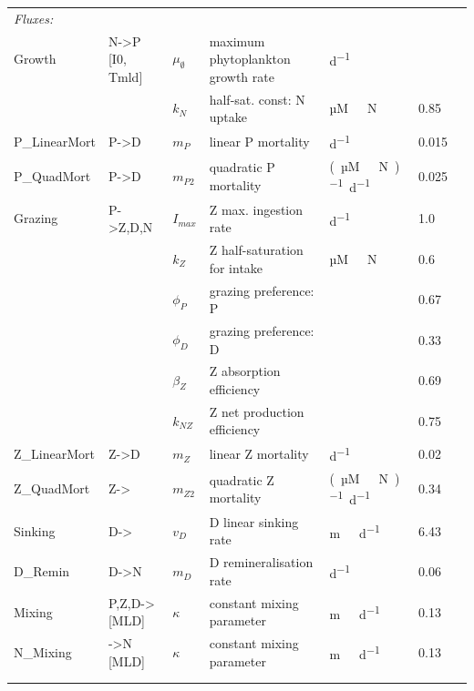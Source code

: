 \documentclass[journal abbreviations, manuscript]{copernicus}
\begin{document}
\begin{table}[t]
\begin{tabular}{l l l l l l l}
\textit{Fluxes:} \\
Growth & N->P [I0, Tmld]& $\mu_{\emptyset}$ & maximum phytoplankton growth rate  & \unit{d^{-1}} & & \\
& & $k_N$ & half-sat. const: N uptake & \unit{µM \ N} & 0.85 & \\
P\_LinearMort & P->D & $m_P$ & linear P mortality & \unit{d^{−1}} & 0.015 & \\
P\_QuadMort & P->D & $m_{P2}$ & quadratic P mortality & \unit{(µM \ N)^{-1} d^{−1}} & 0.025 & \\
Grazing & P->Z,D,N & $I_{max}$ & Z max. ingestion rate & \unit{d^{−1}} & 1.0 & \\
&& $k_Z$ & Z half-saturation for intake & \unit{µM \ N} & 0.6 & \\
&& $\phi_P$ & grazing preference: P & & 0.67 & \\
&& $\phi_D$ & grazing preference: D & & 0.33 & \\
&& $\beta_Z$ & Z absorption efficiency & & 0.69 & \\
&& $k_{NZ}$ & Z net production efficiency & & 0.75 &  \\
Z\_LinearMort & Z->D & $m_Z$ & linear Z mortality  & \unit{d^{−1}} & 0.02 & \\
Z\_QuadMort & Z-> & $m_{Z2}$ & quadratic Z mortality & \unit{(µM \ N)^{-1} d^{−1}} & 0.34 & \\
Sinking & D-> & $v_D$ & D linear sinking rate & \unit{m \ d^{−1}} & 6.43 & \\
D\_Remin & D->N & $m_D$ & D remineralisation rate & \unit{d^{−1}} & 0.06 & \\
Mixing & P,Z,D-> [MLD]& $\kappa$ & constant mixing parameter & \unit{m \ d^{−1}} & 0.13 & \\
N\_Mixing & ->N [MLD]& $\kappa$ & constant mixing parameter & \unit{m \ d^{−1}} & 0.13 & \\ \\

\bottomhline
\end{tabular}
\label{Table:UseCase1Parameters}
\end{table}
%
\end{document}
